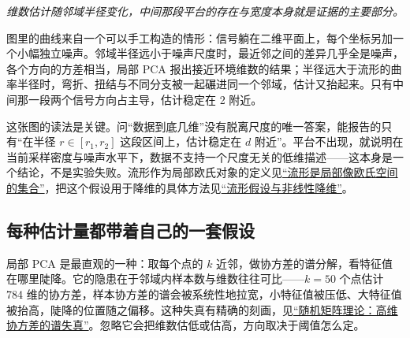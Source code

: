 \begin{center}
\end{center}

\emph{维数估计随邻域半径变化，中间那段平台的存在与宽度本身就是证据的主要部分。}

图里的曲线来自一个可以手工构造的情形：信号躺在二维平面上，每个坐标另加一个小幅独立噪声。邻域半径远小于噪声尺度时，最近邻之间的差异几乎全是噪声，各个方向的方差相当，局部 PCA 报出接近环境维数的结果；半径远大于流形的曲率半径时，弯折、扭结与不同分支被一起碾进同一个邻域，估计又抬起来。只有中间那一段两个信号方向占主导，估计稳定在 2 附近。

这张图的读法是关键。问``数据到底几维''没有脱离尺度的唯一答案，能报告的只有``在半径 \(r\in[r_1,r_2]\) 这段区间上，估计稳定在 \(d\) 附近''。平台不出现，就说明在当前采样密度与噪声水平下，数据不支持一个尺度无关的低维描述——这本身是一个结论，不是实验失败。流形作为局部欧氏对象的定义见\hyperref[sec:12-Real-Analysis-Support/08-Manifold-Basics/01]{``流形是局部像欧氏空间的集合''}，把这个假设用于降维的具体方法见\hyperref[sec:13-Machine-Learning/04-Dimensionality-Reduction/04]{``流形假设与非线性降维''}。

\subsection{每种估计量都带着自己的一套假设}

局部 PCA 是最直观的一种：取每个点的 \(k\) 近邻，做协方差的谱分解，看特征值在哪里陡降。它的隐患在于邻域内样本数与维数往往可比——\(k=50\) 个点估计 784 维的协方差，样本协方差的谱会被系统性地拉宽，小特征值被压低、大特征值被抬高，陡降的位置随之偏移。这种失真有精确的刻画，见\hyperref[ch:094]{``随机矩阵理论：高维协方差的谱失真''}。忽略它会把维数估低或估高，方向取决于阈值怎么定。

